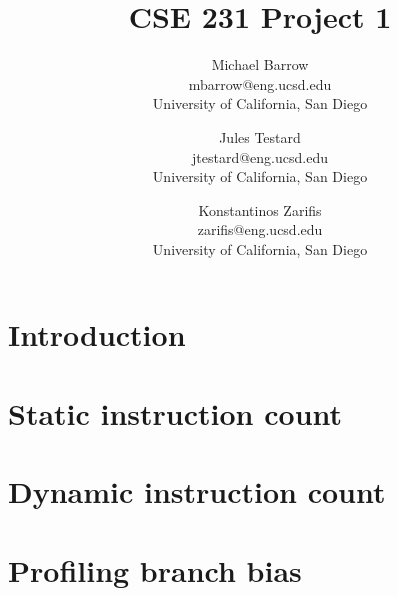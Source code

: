 \documentclass[letterpaper,twocolumn,10pt]{article}
\begin{document}
\date{}

\title{\Large \bf CSE 231 Project 1}

\author{
{\rm Michael Barrow}\\
mbarrow@eng.ucsd.edu\\
University of California, San Diego
\and
{\rm Jules Testard}\\
jtestard@eng.ucsd.edu \\
University of California, San Diego
\and
{Konstantinos Zarifis} \\
zarifis@eng.ucsd.edu \\
University of California, San Diego
}

\maketitle

\thispagestyle{empty}


\section{Introduction}

\section{Static instruction count}

\section{Dynamic instruction count}

\section{Profiling branch bias}


{\footnotesize 
}
\theendnotes
\end{document}
